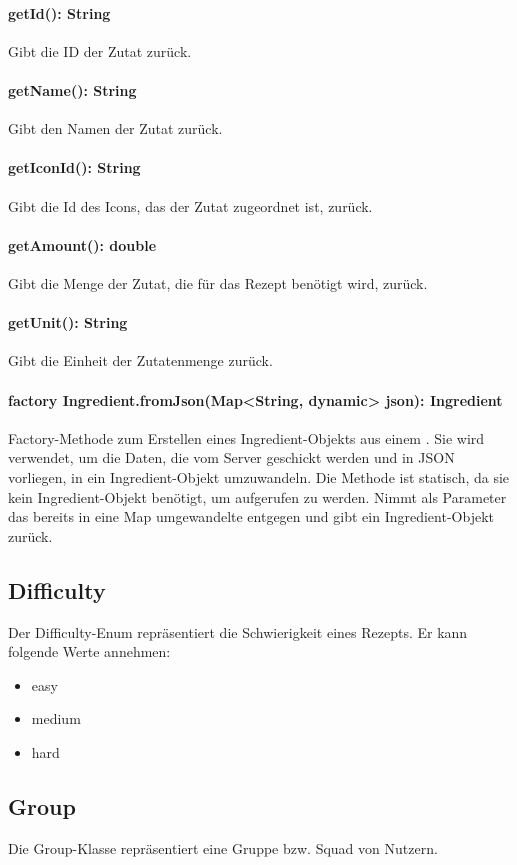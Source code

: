 \documentclass[parskip=full]{scrartcl}
\begin{document}
\paragraph{getId(): String}
Gibt die ID der Zutat zurück.
\paragraph{getName(): String}
Gibt den Namen der Zutat zurück.
\paragraph{getIconId(): String}
Gibt die Id des Icons, das der Zutat zugeordnet ist, zurück.
\paragraph{getAmount(): double}
Gibt die Menge der Zutat, die für das Rezept benötigt wird, zurück.
\paragraph{getUnit(): String}
Gibt die Einheit der Zutatenmenge zurück.
\paragraph{factory Ingredient.fromJson(Map<String, dynamic> json): Ingredient}
Factory-Methode zum Erstellen eines Ingredient-Objekts aus einem . Sie wird verwendet, um die Daten, die vom Server geschickt werden und in \Gls{JSON} vorliegen, in ein Ingredient-Objekt umzuwandeln. Die Methode ist statisch, da sie kein Ingredient-Objekt benötigt, um aufgerufen zu werden. Nimmt als Parameter das bereits in eine Map umgewandelte  entgegen und gibt ein Ingredient-Objekt zurück.
\subsection{Difficulty}
Der Difficulty-Enum repräsentiert die Schwierigkeit eines Rezepts. Er kann folgende Werte annehmen:
\begin{itemize}
    \item easy
    \item medium
    \item hard
\end{itemize}

\subsection{Group}
Die Group-Klasse repräsentiert eine Gruppe bzw. Squad von Nutzern.
\end{document}
